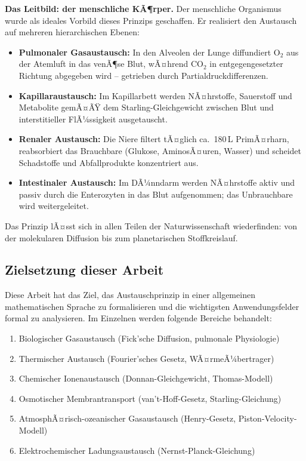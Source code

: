 ﻿\documentclass[a4paper,12pt]{article}
\theoremstyle{definition}
\begin{document}
\textbf{Das Leitbild: der menschliche KÃ¶rper.}
Der menschliche Organismus wurde als ideales Vorbild dieses Prinzips geschaffen. Er realisiert
den Austausch auf mehreren hierarchischen Ebenen:
\begin{itemize}
    \item \textbf{Pulmonaler Gasaustausch:} In den Alveolen der Lunge diffundiert $\mathrm{O}_2$
          aus der Atemluft in das venÃ¶se Blut, wÃ¤hrend $\mathrm{CO}_2$ in entgegengesetzter
          Richtung abgegeben wird -- getrieben durch Partialdruckdifferenzen.
    \item \textbf{Kapillaraustausch:} Im Kapillarbett werden NÃ¤hrstoffe, Sauerstoff und
          Metabolite gemÃ¤ÃŸ dem Starling-Gleichgewicht zwischen Blut und interstitieller
          FlÃ¼ssigkeit ausgetauscht.
    \item \textbf{Renaler Austausch:} Die Niere filtert tÃ¤glich ca.\ 180\,L PrimÃ¤rharn,
          reabsorbiert das Brauchbare (Glukose, AminosÃ¤uren, Wasser) und scheidet Schadstoffe
          und Abfallprodukte konzentriert aus.
    \item \textbf{Intestinaler Austausch:} Im DÃ¼nndarm werden NÃ¤hrstoffe aktiv und passiv
          durch die Enterozyten in das Blut aufgenommen; das Unbrauchbare wird weitergeleitet.
\end{itemize}

Das Prinzip lÃ¤sst sich in allen Teilen der Naturwissenschaft wiederfinden: von der
molekularen Diffusion bis zum planetarischen Stoffkreislauf.

\subsection{Zielsetzung dieser Arbeit}

Diese Arbeit hat das Ziel, das Austauschprinzip in einer allgemeinen mathematischen Sprache
zu formalisieren und die wichtigsten Anwendungsfelder formal zu analysieren.
Im Einzelnen werden folgende Bereiche behandelt:
\begin{enumerate}
    \item Biologischer Gasaustausch (Fick'sche Diffusion, pulmonale Physiologie)
    \item Thermischer Austausch (Fourier'sches Gesetz, WÃ¤rmeÃ¼bertrager)
    \item Chemischer Ionenaustausch (Donnan-Gleichgewicht, Thomas-Modell)
    \item Osmotischer Membrantransport (van't-Hoff-Gesetz, Starling-Gleichung)
    \item AtmosphÃ¤risch-ozeanischer Gasaustausch (Henry-Gesetz, Piston-Velocity-Modell)
    \item Elektrochemischer Ladungsaustausch (Nernst-Planck-Gleichung)
\end{enumerate}
\end{document}
